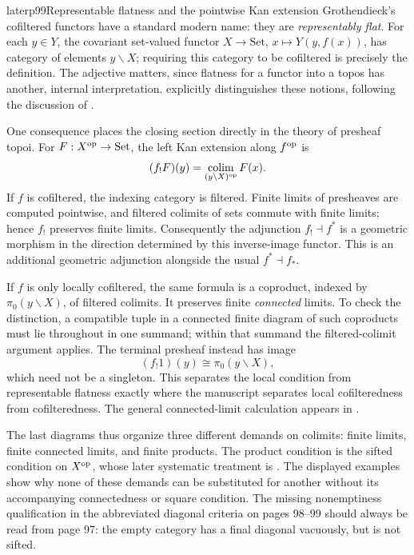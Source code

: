 \begin{dcomment}{later}{p99}{Representable flatness and the pointwise Kan extension}
Grothendieck's cofiltered functors have a standard modern name: they are \emph{representably flat}. For each $y\in Y$, the covariant set-valued functor $X\to\mathrm{Set}$, $x\mapsto Y(y,f(x))$, has category of elements $y\backslash X$; requiring this category to be cofiltered is precisely the definition. The adjective matters, since flatness for a functor into a topos has another, internal interpretation. \citet[Remark 2.4]{Tendas2024} explicitly distinguishes these notions, following the discussion of \citet{Shulman2011Flat}.

One consequence places the closing section directly in the theory of presheaf topoi. For $F:X^{\rm op}\to\mathrm{Set}$, the left Kan extension along $f^{\rm op}$ is
\[
(f_!F)(y)=\mathop{\rm colim}_{(y\backslash X)^{\rm op}}F(x).
\]
If $f$ is cofiltered, the indexing category is filtered. Finite limits of presheaves are computed pointwise, and filtered colimits of sets commute with finite limits; hence $f_!$ preserves finite limits. Consequently the adjunction $f_!\dashv f^*$ is a geometric morphism in the direction determined by this inverse-image functor. This is an additional geometric adjunction alongside the usual $f^*\dashv f_*$.

If $f$ is only locally cofiltered, the same formula is a coproduct, indexed by $\pi_0(y\backslash X)$, of filtered colimits. It preserves finite \emph{connected} limits. To check the distinction, a compatible tuple in a connected finite diagram of such coproducts must lie throughout in one summand; within that summand the filtered-colimit argument applies. The terminal presheaf instead has image
\[
(f_!1)(y)\cong\pi_0(y\backslash X),
\]
which need not be a singleton. This separates the local condition from representable flatness exactly where the manuscript separates local cofilteredness from cofilteredness. The general connected-limit calculation appears in \citet[Lemma 4.19.9]{StacksFiltered2026}.

The last diagrams thus organize three different demands on colimits: finite limits, finite connected limits, and finite products. The product condition is the sifted condition on $X^{\rm op}$, whose later systematic treatment is \citet[Section 1]{AdamekRosickyVitale2010}. The displayed examples show why none of these demands can be substituted for another without its accompanying connectedness or square condition. The missing nonemptiness qualification in the abbreviated diagonal criteria on pages 98--99 should always be read from page 97: the empty category has a final diagonal vacuously, but is not sifted.
\end{dcomment}
